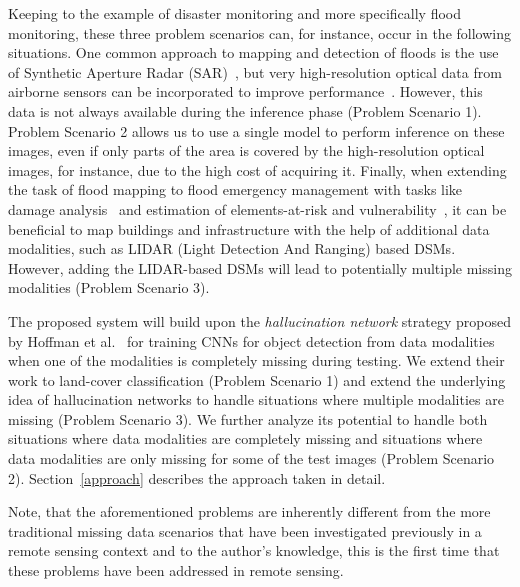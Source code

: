 \documentclass[journal]{IEEEtran}
\begin{document}
Keeping to the example of disaster monitoring and more specifically flood monitoring, these three problem scenarios can, for instance, occur in the following situations. One common approach to mapping and detection of floods is the use of Synthetic Aperture Radar (SAR)~\cite{serpico2012}, but very high-resolution optical data from airborne sensors can be incorporated to improve performance~\cite{serpico2012}. However, this data is not always available during the inference phase (Problem Scenario 1). Problem Scenario 2 allows us to use a single model to perform inference on these images, even if only parts of the area is covered by the high-resolution optical images, for instance, due to the high cost of acquiring it. Finally, when extending the task of flood mapping to flood emergency management with tasks like damage analysis~\cite{brunner2010, gueguen2015} and estimation of elements-at-risk and vulnerability~\cite{serpico2012}, it can be beneficial to map buildings and infrastructure with the help of additional data modalities, such as LIDAR (Light Detection And Ranging) based DSMs. However, adding the LIDAR-based DSMs will lead to potentially multiple missing modalities (Problem Scenario 3).

The proposed system will build upon the \emph{hallucination network} strategy proposed by Hoffman et al.~\cite{Hoffman_2016_CVPR} for training CNNs for object detection from data modalities when one of the modalities is completely missing during testing. We extend their work to land-cover classification (Problem Scenario 1) and extend the underlying idea of hallucination networks to handle situations where multiple modalities are missing (Problem Scenario 3). We further analyze its potential to handle both situations where data modalities are completely missing and situations where data modalities are only missing for some of the test images (Problem Scenario 2). Section~\ref{approach} describes the approach taken in detail.

Note, that the aforementioned problems are inherently different from the more traditional missing data scenarios that have been investigated previously in a remote sensing context and to the author's knowledge, this is the first time that these problems have been addressed in remote sensing.
\end{document}
